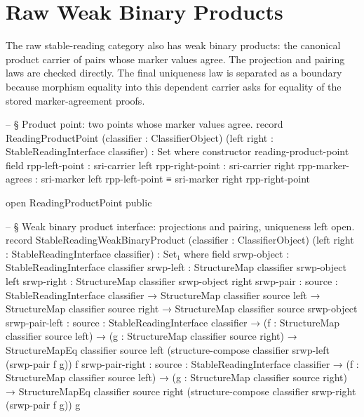 \documentclass[11pt]{article}
\begin{document}
\section{Raw Weak Binary Products}

The raw stable-reading category also has weak binary products: the
canonical product carrier of pairs whose marker values
agree.  The projection and pairing laws are checked directly.  The final
uniqueness law is separated as a boundary because morphism equality into
this dependent carrier asks for equality of the stored marker-agreement
proofs.

\begin{code}
-- § Product point: two points whose marker values agree.
record ReadingProductPoint
  (classifier : ClassifierObject)
  (left right : StableReadingInterface classifier) : Set where
  constructor reading-product-point
  field
    rpp-left-point    : sri-carrier left
    rpp-right-point   : sri-carrier right
    rpp-marker-agrees : sri-marker left rpp-left-point ≡ sri-marker right rpp-right-point

open ReadingProductPoint public

-- § Weak binary product interface: projections and pairing, uniqueness left open.
record StableReadingWeakBinaryProduct
  (classifier : ClassifierObject)
  (left right : StableReadingInterface classifier) : Set₁ where
  field
    srwp-object : StableReadingInterface classifier
    srwp-left   : StructureMap classifier srwp-object left
    srwp-right  : StructureMap classifier srwp-object right
    srwp-pair   : {source : StableReadingInterface classifier} →
                  StructureMap classifier source left →
                  StructureMap classifier source right →
                  StructureMap classifier source srwp-object
    srwp-pair-left : {source : StableReadingInterface classifier} →
                     (f : StructureMap classifier source left) →
                     (g : StructureMap classifier source right) →
                     StructureMapEq classifier source left
                       (structure-compose classifier srwp-left (srwp-pair f g))
                       f
    srwp-pair-right : {source : StableReadingInterface classifier} →
                      (f : StructureMap classifier source left) →
                      (g : StructureMap classifier source right) →
                      StructureMapEq classifier source right
                        (structure-compose classifier srwp-right (srwp-pair f g))
                        g


\end{code}
\end{document}
